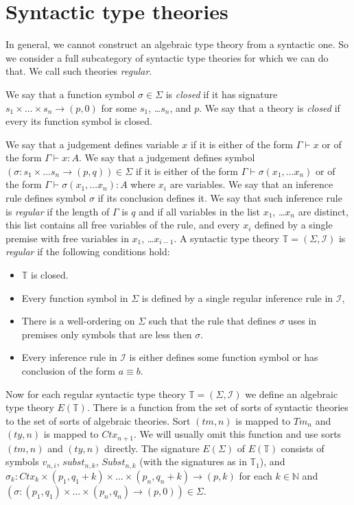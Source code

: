 \documentclass[reqno]{amsart}
\theoremstyle{definition}
\theoremstyle{remark}
\newcommand{\deq}{\equiv}
\numberwithin{figure}{section}
\begin{document}

\section{Syntactic type theories}

In general, we cannot construct an algebraic type theory from a syntactic one.
So we consider a full subcategory of syntactic type theories for which we can do that.
We call such theories \emph{regular}.

We say that a function symbol $\sigma \in \Sigma$ is \emph{closed} if it has signature $s_1 \times \ldots \times s_n \to (p,0)$ for some $s_1$, \ldots $s_n$, and $p$.
We say that a theory is \emph{closed} if every its function symbol is closed.

We say that a judgement defines variable $x$ if it is either of the form $\Gamma \vdash x$ or of the form $\Gamma \vdash x : A$.
We say that a judgement defines symbol $(\sigma : s_1 \times \ldots s_n \to (p,q)) \in \Sigma$ if it is either
of the form $\Gamma \vdash \sigma(x_1, \ldots x_n)$ or of the form $\Gamma \vdash \sigma(x_1, \ldots x_n) : A$ where $x_i$ are variables.
We say that an inference rule defines symbol $\sigma$ if its conclusion defines it.
We say that such inference rule is \emph{regular} if the length of $\Gamma$ is $q$ and
if all variables in the list $x_1$, \ldots $x_n$ are distinct, this list contains all free variables of the rule,
and every $x_i$ defined by a single premise with free variables in $x_1$, \ldots $x_{i-1}$.
A syntactic type theory $\mathbb{T} = (\Sigma, \mathcal{I})$ is \emph{regular} if the following conditions hold:
\begin{itemize}
\item $\mathbb{T}$ is closed.
\item Every function symbol in $\Sigma$ is defined by a single regular inference rule in $\mathcal{I}$,
\item There is a well-ordering on $\Sigma$ such that the rule that defines $\sigma$ uses in premises only symbols that are less then $\sigma$.
\item Every inference rule in $\mathcal{I}$ is either defines some function symbol or has conclusion of the form $a \deq b$.
\end{itemize}

Now for each regular syntactic type theory $\mathbb{T} = (\Sigma, \mathcal{I})$ we define an algebraic type theory $E(\mathbb{T})$.
There is a function from the set of sorts of syntactic theories to the set of sorts of algebraic theories.
Sort $(tm,n)$ is mapped to $Tm_n$ and $(ty,n)$ is mapped to $Ctx_{n+1}$.
We will usually omit this function and use sorts $(tm,n)$ and $(ty,n)$ directly.
The signature $E(\Sigma)$ of $E(\mathbb{T})$ consists of symbols $v_{n,i}$, $subst_{n,k}$, $Subst_{n,k}$ (with the signatures as in $\mathbb{T}_1$), and
$\sigma_k : Ctx_k \times (p_1,q_1+k) \times \ldots \times (p_n,q_n+k) \to (p,k)$
for each $k \in \mathbb{N}$ and $(\sigma : (p_1,q_1) \times \ldots \times (p_n,q_n) \to (p,0)) \in \Sigma$.
\end{document}
